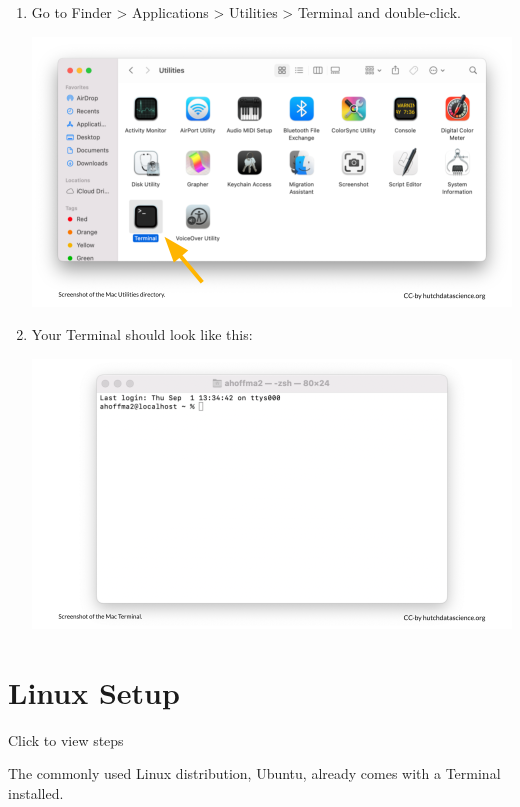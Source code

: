 \documentclass[
]{book}
\begin{document}
\begin{enumerate}
\def\labelenumi{\arabic{enumi}.}
\item
  Go to Finder \textgreater{} Applications \textgreater{} Utilities \textgreater{} Terminal and double-click.

  \includegraphics[width=1\linewidth]{resources/images/03-terminal_files/figure-latex//1BQxrVYdKZTbpCaF-i_q9w7s9x034lEXpQZDU-Sl09cs_g149d37dd4a1_0_9}
\item
  Your Terminal should look like this:

  \includegraphics[width=1\linewidth]{resources/images/03-terminal_files/figure-latex//1BQxrVYdKZTbpCaF-i_q9w7s9x034lEXpQZDU-Sl09cs_g149d37dd4a1_0_2}
\end{enumerate}

\hypertarget{linux}{%
\section{Linux Setup}\label{linux}}

Click to view steps

The commonly used Linux distribution, Ubuntu, already comes with a Terminal installed.
\end{document}
